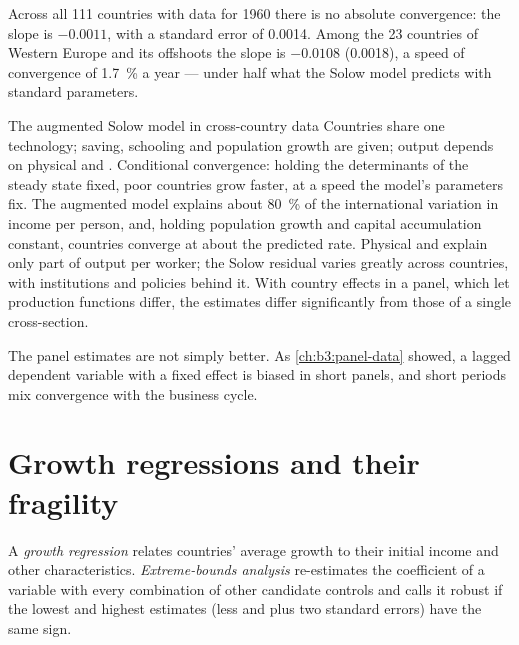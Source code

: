 Across all 111 countries with data for 1960 there is no absolute convergence: the slope is
$-0.0011$, with a standard error of 0.0014. Among the 23 countries of Western Europe and its offshoots
the slope is $-0.0108$ (0.0018), a speed of convergence of 1.7~\% a year --- under half what the
Solow model predicts with standard parameters.

\begin{model}{The augmented Solow model in cross-country data}
\assumes Countries share one technology; saving, schooling and population growth
are given; output depends on physical and .
\predicts Conditional convergence: holding the determinants of the steady state
fixed, poor countries grow faster, at a speed the model's parameters fix.
\tested The augmented model explains about 80~\% of the international variation in
income per person, and, holding population growth and capital accumulation
constant, countries converge at about the predicted rate. %
\breaks Physical and  explain only part of output per worker; the
Solow residual varies greatly across countries, with institutions and policies
behind it. %
With country effects in a panel, which let production functions differ, the
estimates differ significantly from those of a single cross-section. %
\end{model}

The panel estimates are not simply better. As \cref{ch:b3:panel-data} showed, a
lagged dependent variable with a fixed effect is biased in short panels, and short
periods mix convergence with the business cycle.

\section{Growth regressions and their fragility}\label{sec:b3:growth-empirics:regressions}

\begin{definition}\label{def:b3:growth-empirics:growth-regression}
A \emph{growth regression} relates countries' average growth to their initial income
and other characteristics. \emph{Extreme-bounds analysis} re-estimates the coefficient
of a variable with every combination of other candidate controls and calls it robust
if the lowest and highest estimates (less and plus two standard errors) have the same
sign.
\end{definition}

